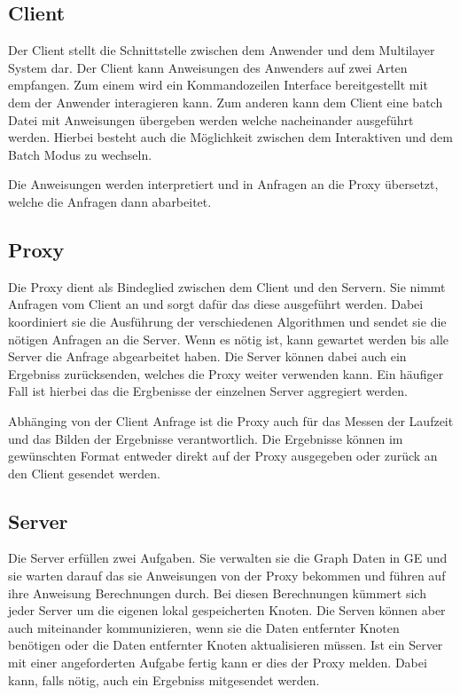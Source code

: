\subsection{Client}

Der Client stellt die Schnittstelle zwischen dem Anwender und dem Multilayer System dar. Der Client kann Anweisungen des Anwenders auf zwei Arten empfangen.
Zum einem wird ein Kommandozeilen Interface bereitgestellt mit dem der Anwender interagieren kann. Zum anderen kann dem Client eine batch Datei mit Anweisungen übergeben werden
welche nacheinander ausgeführt werden.
Hierbei besteht auch die Möglichkeit zwischen dem Interaktiven und dem Batch Modus zu wechseln.

Die Anweisungen werden interpretiert und in Anfragen an die Proxy übersetzt, welche die Anfragen dann abarbeitet.

\subsection{Proxy}

Die Proxy dient als Bindeglied zwischen dem Client und den Servern. Sie nimmt Anfragen vom Client an und sorgt dafür das diese ausgeführt werden.
Dabei koordiniert sie die Ausführung der verschiedenen Algorithmen und sendet sie die nötigen Anfragen an die Server. Wenn es nötig ist, kann gewartet werden 
bis alle Server die Anfrage abgearbeitet haben. Die Server können dabei auch ein Ergebniss zurücksenden, welches die Proxy weiter verwenden kann. Ein häufiger Fall
ist hierbei das die Ergbenisse der einzelnen Server aggregiert werden.


Abhänging von der Client Anfrage ist die Proxy auch für das Messen der Laufzeit und das Bilden der Ergebnisse verantwortlich. Die Ergebnisse können im gewünschten Format entweder direkt auf der Proxy ausgegeben
oder zurück an den Client gesendet werden.

\subsection{Server}

Die Server erfüllen zwei Aufgaben. Sie verwalten sie die Graph Daten in GE und
sie warten darauf das sie Anweisungen von der Proxy bekommen und führen auf ihre Anweisung Berechnungen durch. Bei diesen Berechnungen kümmert sich jeder Server 
um die eigenen lokal gespeicherten Knoten. Die Serven können aber auch miteinander kommunizieren, wenn sie die Daten entfernter Knoten benötigen oder die Daten entfernter Knoten
aktualisieren müssen.
Ist ein Server mit einer angeforderten Aufgabe fertig kann er dies der Proxy melden. Dabei kann, falls nötig, auch ein Ergebniss mitgesendet werden.



